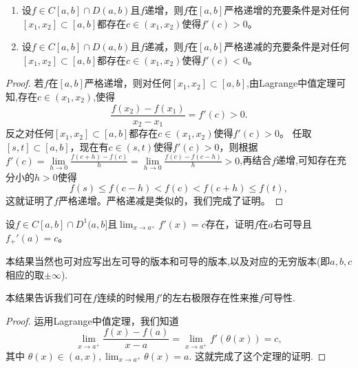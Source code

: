 \documentclass[../../main.tex]{subfiles}
\begin{document}
\begin{theorem}[严格单调和导数的关系]\label{theorem:严格单调和导数的关系}
\begin{enumerate}
\item 设\(f\in C[a,b]\cap D(a,b)\)且\(f\)递增，则\(f\)在\([a,b]\)严格递增的充要条件是对任何\([x_1,x_2]\subset [a,b]\)都存在\(c\in(x_1,x_2)\)使得\(f'(c)>0\)。

\item 设\(f\in C[a,b]\cap D(a,b)\)且\(f\)递减，则\(f\)在\([a,b]\)严格递减的充要条件是对任何\([x_1,x_2]\subset [a,b]\)都存在\(c\in(x_1,x_2)\)使得\(f'(c)<0\)。
\end{enumerate}
\end{theorem}
\begin{proof}
若\(f\)在\([a,b]\)严格递增，则对任何\([x_1,x_2]\subset [a,b]\),由Lagrange中值定理可知,存在\(c\in(x_1,x_2)\),使得
\[
\frac{f(x_2)-f(x_1)}{x_2 - x_1}=f'(c)>0.
\]
反之对任何\([x_1,x_2]\subset [a,b]\)都存在\(c\in(x_1,x_2)\)使得\(f'(c)>0\)。
任取\([s,t]\subset [a,b]\)，现在有\(c\in(s,t)\)使得\(f'(c)>0\)，则根据$f'\left( c \right) =\underset{h\rightarrow 0}{\lim}\frac{f\left( c+h \right) -f\left( c \right)}{h}=\underset{h\rightarrow 0}{\lim}\frac{f\left( c \right) -f\left( c-h \right)}{h}>0$,再结合$f$递增,可知存在充分小的\(h > 0\)使得
\[
f(s)\leqslant f(c - h)<f(c)<f(c + h)\leqslant f(t),
\]
这就证明了\(f\)严格递增。严格递减是类似的，我们完成了证明。
\end{proof}

\begin{theorem}[单侧导数极限定理]\label{theorem:单侧导数极限定理}
设\(f\in C[a,b]\cap D^{1}(a,b]\)且\(\lim_{x\rightarrow a^{+}}f'(x)=c\)存在，证明\(f\)在\(a\)右可导且\(f_{+}'(a)=c\)。
\end{theorem}
\begin{remark}
本结果当然也可对应写出左可导的版本和可导的版本,以及对应的无穷版本(即$a,b,c$相应的取$\pm \infty$).
\end{remark}
\begin{note}
本结果告诉我们可在\(f\)连续的时候用\(f'\)的左右极限存在性来推\(f\)可导性.
\end{note}
\begin{proof}
运用Lagrange中值定理，我们知道
\[\lim_{x\rightarrow a^{+}}\frac{f(x)-f(a)}{x - a}=\lim_{x\rightarrow a^{+}}f'(\theta(x))=c,\]
其中
\(\theta(x)\in(a,x),\lim_{x\rightarrow a^{+}}\theta(x)=a.\)
这就完成了这个定理的证明.
\end{proof}
\end{document}
